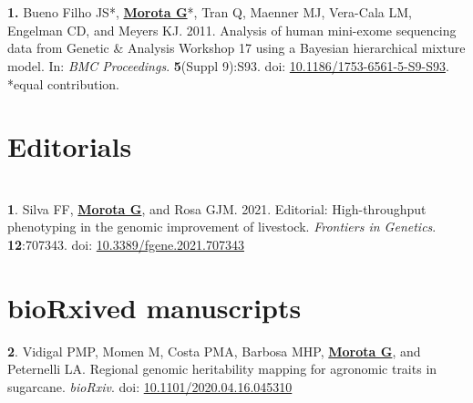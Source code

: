 \documentclass[margin,line,10pt]{res}
\newenvironment{list1}{
  \begin{list}{\ding{113}}{%
      \setlength{\itemsep}{0in}
      \setlength{\parsep}{0in} \setlength{\parskip}{0in}
      \setlength{\topsep}{0in} \setlength{\partopsep}{0in} 
      \setlength{\leftmargin}{0.17in}}}{\end{list}}
\begin{document}
\begin{resume}
\section{}
\begin{list1}
\item [\bf{1}.] Bueno Filho JS*, {\bf \underline{Morota G}}*, Tran Q, Maenner MJ, Vera-Cala LM, Engelman CD, and Meyers KJ. 2011. Analysis of human mini-exome sequencing data from Genetic \& Analysis Workshop 17 using a  Bayesian hierarchical mixture model. In: \emph{BMC Proceedings}. {\bf 5}(Suppl 9):S93. doi: \textcolor{blue}{\href{http://dx.doi.org/10.1186/1753-6561-5-S9-S93}{10.1186/1753-6561-5-S9-S93}}. *equal contribution.   
\end{list1}




\vspace{1.0cm}
\section{\sc Editorials}
\vspace{1.0cm}

\section{}
\begin{list1}
\item [{\bf 1}.]  Silva FF, {\bf \underline{Morota G}}, and Rosa GJM. 2021. Editorial: High-throughput phenotyping in the genomic improvement of livestock. \emph{Frontiers in Genetics}. \textbf{12}:707343. doi: \textcolor{blue}{\href{https://doi.org/10.3389/fgene.2021.707343}{10.3389/fgene.2021.707343}}
\end{list1}





\vspace{1.0cm}
\section{\sc bioRxived manuscripts}

\begin{list1}

  \item [{\bf 2}.] Vidigal PMP, Momen M, Costa PMA, Barbosa MHP, \textbf{\underline{Morota G}}, and Peternelli LA. Regional genomic heritability mapping for agronomic traits in sugarcane. \emph{bioRxiv}. doi: \textcolor{blue}{\href{https://doi.org/10.1101/2020.04.16.045310}{10.1101/2020.04.16.045310}}


\end{list1}
\end{resume}
\end{document}
